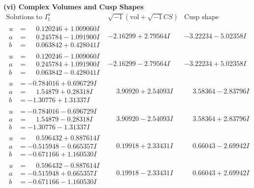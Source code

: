 \documentclass[1p]{elsarticle_modified}
\theoremstyle{definition}
\newcommand{\I}{\sqrt{-1}}
\begin{document}
\newpage\flushleft \textbf{(vi) Complex Volumes and Cusp Shapes}
$$\begin{array}{c|c|c}  
\text{Solutions to }I^u_{1}& \I (\text{vol} + \sqrt{-1}CS) & \text{Cusp shape}\\
 \hline 
\begin{aligned}
u &= \phantom{-}0.120246 + 1.009060 I \\
a &= \phantom{-}0.245784 - 1.091900 I \\
b &= \phantom{-}0.063842 + 0.428041 I\end{aligned}
 & -2.16299 + 2.79564 I & -3.22234 - 5.02358 I \\ \hline\begin{aligned}
u &= \phantom{-}0.120246 - 1.009060 I \\
a &= \phantom{-}0.245784 + 1.091900 I \\
b &= \phantom{-}0.063842 - 0.428041 I\end{aligned}
 & -2.16299 - 2.79564 I & -3.22234 + 5.02358 I \\ \hline\begin{aligned}
u &= -0.784016 + 0.696729 I \\
a &= \phantom{-}1.54879 + 0.28318 I \\
b &= -1.30776 + 1.31337 I\end{aligned}
 & \phantom{-}3.90920 + 2.54093 I & \phantom{-}3.58364 - 2.83796 I \\ \hline\begin{aligned}
u &= -0.784016 - 0.696729 I \\
a &= \phantom{-}1.54879 - 0.28318 I \\
b &= -1.30776 - 1.31337 I\end{aligned}
 & \phantom{-}3.90920 - 2.54093 I & \phantom{-}3.58364 + 2.83796 I \\ \hline\begin{aligned}
u &= \phantom{-}0.596432 + 0.887614 I \\
a &= -0.515948 - 0.665357 I \\
b &= -0.671166 + 1.160530 I\end{aligned}
 & \phantom{-}0.19918 + 2.33431 I & \phantom{-}0.66043 - 2.69942 I \\ \hline\begin{aligned}
u &= \phantom{-}0.596432 - 0.887614 I \\
a &= -0.515948 + 0.665357 I \\
b &= -0.671166 - 1.160530 I\end{aligned}
 & \phantom{-}0.19918 - 2.33431 I & \phantom{-}0.66043 + 2.69942 I \\ \hline\begin{aligned}

\end{aligned}
\end{array}$$
\end{document}

